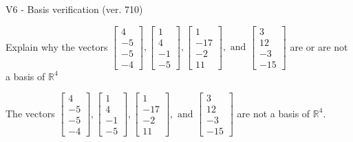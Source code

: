 \begin{exercise}
  \begin{exerciseTitle}V6 - Basis verification (ver. 710)\end{exerciseTitle}
  \begin{exerciseStatement}
    Explain why the vectors \(\left[\begin{array}{r}
4 \\
-5 \\
-5 \\
-4
\end{array}\right] , \left[\begin{array}{r}
1 \\
4 \\
-1 \\
-5
\end{array}\right] , \left[\begin{array}{r}
1 \\
-17 \\
-2 \\
11
\end{array}\right] , \text{ and } \left[\begin{array}{r}
3 \\
12 \\
-3 \\
-15
\end{array}\right]\) are or are not a basis of \(\mathbb{R}^4\)	


  \end{exerciseStatement}
  \begin{exerciseAnswer}
   The vectors \(\left[\begin{array}{r}
4 \\
-5 \\
-5 \\
-4
\end{array}\right] , \left[\begin{array}{r}
1 \\
4 \\
-1 \\
-5
\end{array}\right] , \left[\begin{array}{r}
1 \\
-17 \\
-2 \\
11
\end{array}\right] , \text{ and } \left[\begin{array}{r}
3 \\
12 \\
-3 \\
-15
\end{array}\right]\) 
  	 are not  a basis of \(\mathbb{R}^4\).
  


  \end{exerciseAnswer}
\end{exercise}